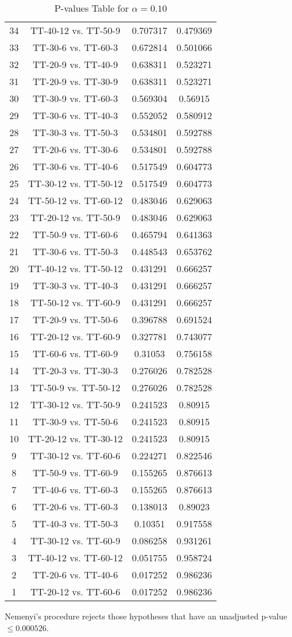 \documentclass[a4paper,10pt]{article}
\begin{document}
\begin{landscape}
\begin{table}[!htp]
\begin{tabular}{cccc}
34&TT-40-12 vs. TT-50-9&0.707317&0.479369\\
33&TT-30-6 vs. TT-60-3&0.672814&0.501066\\
32&TT-20-9 vs. TT-40-9&0.638311&0.523271\\
31&TT-20-9 vs. TT-30-9&0.638311&0.523271\\
30&TT-30-9 vs. TT-60-3&0.569304&0.56915\\
29&TT-30-6 vs. TT-40-3&0.552052&0.580912\\
28&TT-30-3 vs. TT-50-3&0.534801&0.592788\\
27&TT-20-6 vs. TT-30-6&0.534801&0.592788\\
26&TT-30-6 vs. TT-40-6&0.517549&0.604773\\
25&TT-30-12 vs. TT-50-12&0.517549&0.604773\\
24&TT-50-12 vs. TT-60-12&0.483046&0.629063\\
23&TT-20-12 vs. TT-50-9&0.483046&0.629063\\
22&TT-50-9 vs. TT-60-6&0.465794&0.641363\\
21&TT-30-6 vs. TT-50-3&0.448543&0.653762\\
20&TT-40-12 vs. TT-50-12&0.431291&0.666257\\
19&TT-30-3 vs. TT-40-3&0.431291&0.666257\\
18&TT-50-12 vs. TT-60-9&0.431291&0.666257\\
17&TT-20-9 vs. TT-50-6&0.396788&0.691524\\
16&TT-20-12 vs. TT-60-9&0.327781&0.743077\\
15&TT-60-6 vs. TT-60-9&0.31053&0.756158\\
14&TT-20-3 vs. TT-30-3&0.276026&0.782528\\
13&TT-50-9 vs. TT-50-12&0.276026&0.782528\\
12&TT-30-12 vs. TT-50-9&0.241523&0.80915\\
11&TT-30-9 vs. TT-50-6&0.241523&0.80915\\
10&TT-20-12 vs. TT-30-12&0.241523&0.80915\\
9&TT-30-12 vs. TT-60-6&0.224271&0.822546\\
8&TT-50-9 vs. TT-60-9&0.155265&0.876613\\
7&TT-40-6 vs. TT-60-3&0.155265&0.876613\\
6&TT-20-6 vs. TT-60-3&0.138013&0.89023\\
5&TT-40-3 vs. TT-50-3&0.10351&0.917558\\
4&TT-30-12 vs. TT-60-9&0.086258&0.931261\\
3&TT-40-12 vs. TT-60-12&0.051755&0.958724\\
2&TT-20-6 vs. TT-40-6&0.017252&0.986236\\
1&TT-20-12 vs. TT-60-6&0.017252&0.986236\\
\hline
\end{tabular}
\caption{P-values Table for $\alpha=0.10$}
\end{table}Nemenyi's procedure rejects those hypotheses that have an unadjusted p-value $\le0.000526$.


\end{landscape}
\end{document}

